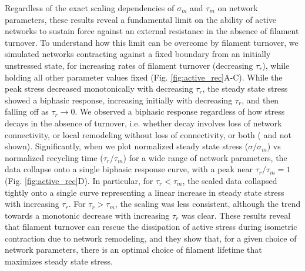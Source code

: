 Regardless of the exact scaling dependencies of $\sigma_m$ and $\tau_m$ on network parameters, these results reveal a fundamental limit on the ability of active networks to sustain force against an external resistance in the absence of filament turnover.  To understand how this limit can be overcome by filament turnover, we simulated networks contracting against a fixed boundary from an initially unstressed state, for increasing rates of filament turnover (decreasing $\tau_r$), while holding all other parameter values fixed (Fig. \ref{fig:active_rec}A-C). While the peak stress decreased monotonically with decreasing $\tau_r$, the steady state stress showed a biphasic response, increasing initially with decreasing $\tau_r$, and then falling off as $\tau_r \to 0$.  We observed a biphasic response regardless of how stress decays in the absence of turnover, i.e. whether decay involves loss of network connectivity, or local remodeling without loss of connectivity, or both ( and not shown). Significantly, when we plot normalized steady state stress ($\sigma/\sigma_m$) vs normalized recycling time ($\tau_r$/$\tau_m$) for a wide range of network parameters, the data collapse onto a single biphasic response curve, with a peak near $\tau_r/\tau_m = 1$ (Fig. \ref{fig:active_rec}D). In particular, for $\tau_r < \tau_m$, the scaled data collapsed tightly onto a single curve representing a linear increase in steady state stress with increasing $\tau_r$. For $\tau_r > \tau_m$, the scaling was less consistent, although the trend towards a monotonic decrease with increasing $\tau_r$ was clear. These results reveal that filament turnover can rescue the dissipation of active stress during isometric contraction due to network remodeling, and they show that, for a given choice of network parameters, there is an optimal choice of filament lifetime that maximizes steady state stress.

